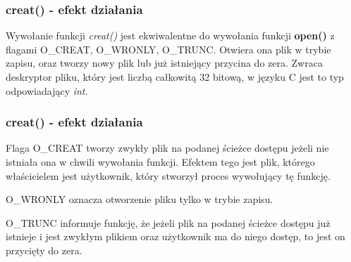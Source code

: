 \documentclass{beamer}
\begin{document}



\maketitle
\begin{frame}
	\frametitle{creat() - efekt działania}
	Wywołanie funkcji \textit{creat()} jest ekwiwalentne do wywołania funkcji \textbf{open()} z flagami O\_CREAT, O\_WRONLY, O\_TRUNC.
	Otwiera ona plik w trybie zapisu, oraz tworzy nowy plik lub już istniejący przycina do zera.
	Zwraca deskryptor pliku, który jest liczbą całkowitą 32 bitową, w języku C jest to typ odpowiadający \textit{int}.
\end{frame}

\begin{frame}
	\frametitle{creat() - efekt działania}
	Flaga O\_CREAT tworzy zwykły plik na podanej ścieżce dostępu jeżeli nie istniała ona w chwili wywołania funkcji. Efektem tego jest plik, którego właścicielem jest użytkownik, który stworzył proces wywołujący tę funkcję.

	O\_WRONLY oznacza otworzenie pliku tylko w trybie zapisu.

	O\_TRUNC informuje funkcję, że jeżeli plik na podanej ścieżce dostępu już istnieje i jest zwykłym plikiem oraz użytkownik ma do niego dostęp, to jest on przycięty do zera.
\end{frame}
\end{document}
